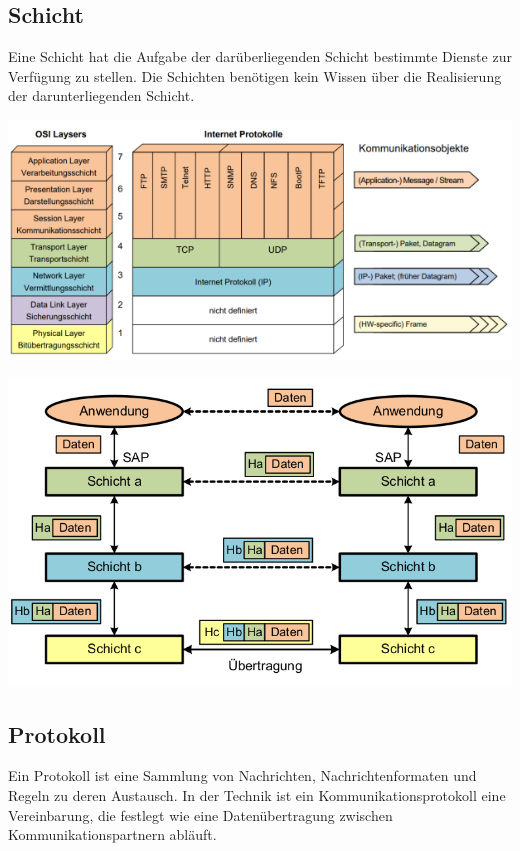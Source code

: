 \subsection{Schicht}
{Eine Schicht hat die Aufgabe der darüberliegenden Schicht bestimmte
    Dienste zur Verfügung zu stellen. Die Schichten benötigen kein Wissen über die Realisierung
    der darunterliegenden Schicht.

        {\includegraphics[scale=.4]{img/osi-1.png}}

        {\includegraphics[scale=.3]{img/osi-2.png}}}
\subsection{Protokoll}
{Ein Protokoll ist eine Sammlung von Nachrichten, Nachrichtenformaten und Regeln zu deren Austausch.
    In der Technik ist ein Kommunikationsprotokoll eine Vereinbarung, die festlegt wie eine Datenübertragung zwischen Kommunikationspartnern abläuft.}


